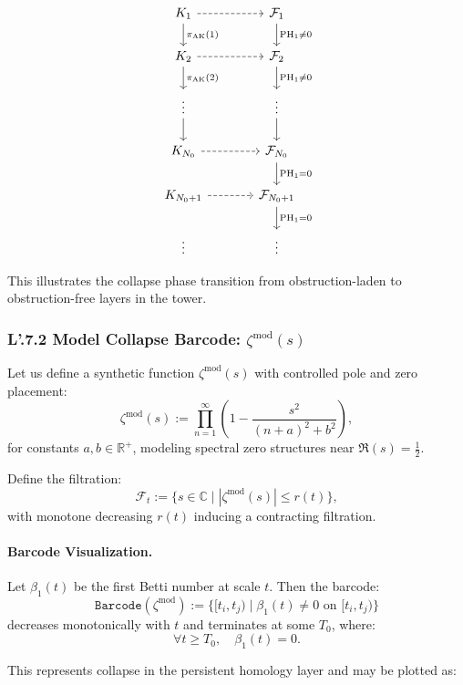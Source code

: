 \documentclass[11pt]{article}
\begin{document}
\[
\begin{tikzcd}[column sep=large]
K_1 \arrow[d, "\pi_{\mathrm{AK}}(1)"] \arrow[r, dashrightarrow] & \mathcal{F}_1 \arrow[d, "\mathrm{PH}_1 \neq 0"] \\
K_2 \arrow[d, "\pi_{\mathrm{AK}}(2)"] \arrow[r, dashrightarrow] & \mathcal{F}_2 \arrow[d, "\mathrm{PH}_1 \neq 0"] \\
\vdots \arrow[d] & \vdots \arrow[d] \\
K_{N_0} \arrow[r, dashrightarrow] & \mathcal{F}_{N_0} \arrow[d, "\mathrm{PH}_1 = 0"] \\
K_{N_0+1} \arrow[r, dashrightarrow] & \mathcal{F}_{N_0+1} \arrow[d, "\mathrm{PH}_1 = 0"] \\
\vdots & \vdots
\end{tikzcd}
\]

This illustrates the collapse phase transition from obstruction-laden to obstruction-free layers in the tower.

\subsubsection*{L'.7.2 Model Collapse Barcode: $\zeta^{\mathrm{mod}}(s)$}

Let us define a synthetic function $\zeta^{\mathrm{mod}}(s)$ with controlled pole and zero placement:
\[
\zeta^{\mathrm{mod}}(s) := \prod_{n=1}^\infty \left( 1 - \frac{s^2}{(n + a)^2 + b^2} \right),
\]
for constants $a, b \in \mathbb{R}^+$, modeling spectral zero structures near $\Re(s) = \tfrac{1}{2}$.

Define the filtration:
\[
\mathcal{F}_t := \{ s \in \mathbb{C} \mid |\zeta^{\mathrm{mod}}(s)| \leq r(t) \},
\]
with monotone decreasing $r(t)$ inducing a contracting filtration.

\paragraph{Barcode Visualization.}
Let $\beta_1(t)$ be the first Betti number at scale $t$. Then the barcode:
\[
\texttt{Barcode}(\zeta^{\mathrm{mod}}) := \{ [t_i, t_j) \mid \beta_1(t) \neq 0 \text{ on } [t_i, t_j) \}
\]
decreases monotonically with $t$ and terminates at some $T_0$, where:
\[
\forall t \geq T_0, \quad \beta_1(t) = 0.
\]

This represents collapse in the persistent homology layer and may be plotted as:

\begin{center}
\end{center}
\end{document}
